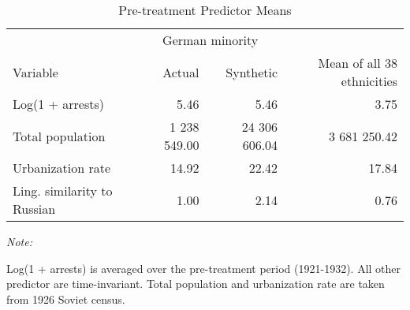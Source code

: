 \begin{table}[!h]

\caption{\label{tab:sc_predictor_means}Pre-treatment Predictor Means}
\centering
\begin{threeparttable}
\begin{tabular}{lrrr}
\toprule
\multicolumn{1}{c}{ } & \multicolumn{2}{c}{German minority} \\
\cmidrule(l{2pt}r{2pt}){2-3}
Variable & Actual & Synthetic & Mean of all 38 ethnicities\\
\midrule
Log(1 + arrests) & 5.46 & 5.46 & 3.75\\
Total population & 1 238 549.00 & 24 306 606.04 & 3 681 250.42\\
Urbanization rate & 14.92 & 22.42 & 17.84\\
Ling. similarity to Russian & 1.00 & 2.14 & 0.76\\
\bottomrule
\end{tabular}
\begin{tablenotes}
\item \textit{Note: } 
\item Log(1 + arrests) is averaged over the pre-treatment period (1921-1932). All other predictor are time-invariant. Total population and urbanization rate are taken from 1926 Soviet census.
\end{tablenotes}
\end{threeparttable}
\end{table}